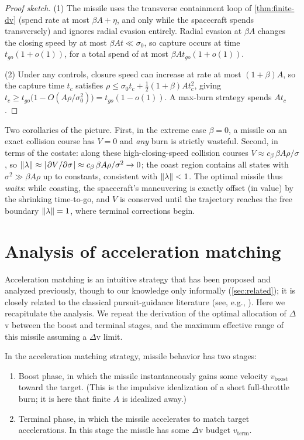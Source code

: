 \documentclass{article}
\renewcommand{\vec}[1]{\mathbf{#1}}
\theoremstyle{remark}
\begin{document}
\begin{proof}[Proof sketch]
  (1) The missile uses the transverse containment loop of
  \cref{thm:finite-dv} (spend rate at most $\beta A + \eta$, and only while
  the spacecraft spends transversely) and ignores radial evasion entirely.
  Radial evasion at $\beta A$ changes the closing speed by at most
  $\beta A t \ll \sigma_0$, so capture occurs at time $t_{go}(1 + o(1))$, for a
  total spend of at most $\beta A t_{go} (1 + o(1))$.

  (2) Under any controls, closure speed can increase at rate at most
  $(1+\beta)A$, so the capture time $t_c$ satisfies
  $\rho \le \sigma_0 t_c + \tfrac12 (1+\beta) A t_c^2$, giving
  $t_c \ge t_{go}\big(1 - O(A\rho/\sigma_0^2)\big) = t_{go}(1 - o(1))$.  A
  max-burn strategy spends $A t_c$.
\end{proof}

Two corollaries of the picture.  First, in the extreme case $\beta = 0$, a
missile on an exact collision course has $V = 0$ and \emph{any} burn is
strictly wasteful.  Second, in terms of the costate: along these
high-closing-speed collision courses $V \approx c_\beta\, \beta A \rho /
\sigma$, so $\norm{\vec\lambda} \approx \abs{\pdv*{V}{\sigma}} \approx
c_\beta\, \beta A \rho / \sigma^2 \to 0$; the coast region contains all states
with $\sigma^2 \gg \beta A \rho$ up to constants, consistent with
$\norm{\vec\lambda} < 1$.  The optimal missile thus \emph{waits}: while
coasting, the spacecraft's maneuvering is exactly offset (in value) by the
shrinking time-to-go, and $V$ is conserved until the trajectory reaches the
free boundary $\norm{\vec\lambda} = 1$, where terminal corrections begin.

\section{Analysis of acceleration matching}
\label{sec:matching}

Acceleration matching is an intuitive strategy that has been proposed and
analyzed previously, though to our knowledge only informally
(\cref{sec:related}); it is closely related to the classical
pursuit-guidance literature (see, e.g., \cite{zarchan2012,ho1965}). Here we
recapitulate the analysis. We repeat the derivation of the optimal allocation
of $\Delta$v between the boost and terminal stages, and the maximum effective
range of this missile assuming a $\Delta$v limit.

In the acceleration matching strategy, missile behavior has two stages:
\begin{enumerate}
\item Boost phase, in which the missile instantaneously gains some velocity
$v_\text{boost}$ toward the target.  (This is the impulsive idealization of a
short full-throttle burn; it is here that finite $A$ is idealized away.)
\item Terminal phase, in which the missile accelerates to match target
accelerations. In this stage the missile has some $\Delta$v budget
$v_\text{term}$.
\end{enumerate}
\end{document}

